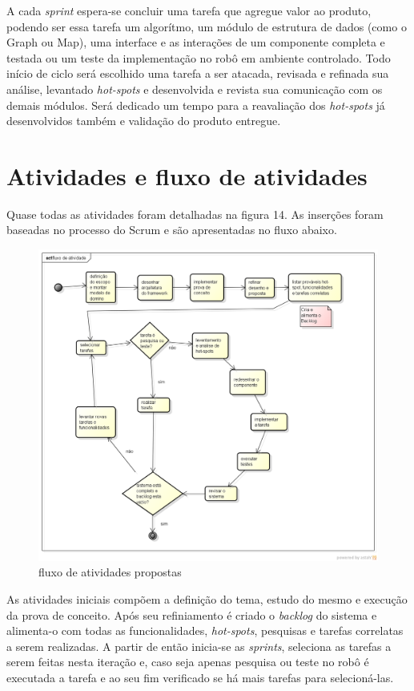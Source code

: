 A cada \textit{sprint} espera-se concluir uma tarefa que agregue valor ao produto, podendo ser essa tarefa um algorítmo, um módulo de estrutura de dados (como o Graph ou Map), uma interface e as interações de um componente completa e testada ou um teste da implementação no robô em ambiente controlado. Todo início de ciclo será escolhido uma tarefa a ser atacada, revisada e refinada sua análise, levantado \textit{hot-spots} e desenvolvida e revista sua comunicação com os demais módulos. Será dedicado um tempo para a reavaliação dos \textit{hot-spots} já desenvolvidos também e validação do produto entregue.

\section{Atividades e fluxo de atividades}

Quase todas as atividades foram detalhadas na figura 14. As inserções foram baseadas no processo do Scrum e são apresentadas no fluxo abaixo.

\begin{figure}[h]
	\centering
	\label{fig28}
		\includegraphics[keepaspectratio=true,scale=0.4]{figuras/fluxoatvd.png}
	\caption{fluxo de atividades propostas}
\end{figure}

As atividades iniciais compõem a definição do tema, estudo do mesmo e execução da prova de conceito. Após seu refiniamento é criado o \textit{backlog} do sistema e alimenta-o com todas as funcionalidades, \textit{hot-spots}, pesquisas e tarefas correlatas a serem realizadas. A partir de então inicia-se as \textit{sprints}, seleciona as tarefas a serem feitas nesta iteração e, caso seja apenas pesquisa ou teste no robô é executada a tarefa e ao seu fim verificado se há mais tarefas para selecioná-las.

